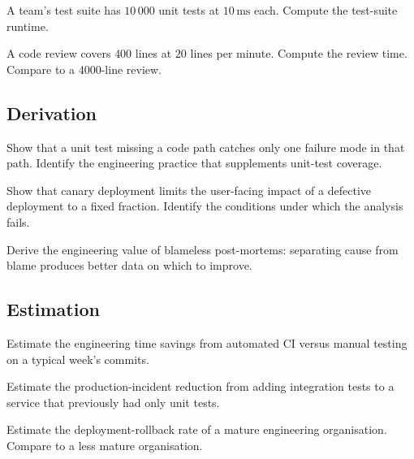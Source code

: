 \begin{exercise}
A team's test suite has $10\,000$ unit tests at $10\,\si{\milli\second}$ each. Compute the test-suite runtime.
\end{exercise}

\begin{exercise}
A code review covers $400$ lines at $20$ lines per minute. Compute the review time. Compare to a $4000$-line review.
\end{exercise}

\subsection*{Derivation}

\begin{exercise}
Show that a unit test missing a code path catches only one failure mode in that path. Identify the engineering practice that supplements unit-test coverage.
\end{exercise}

\begin{exercise}
Show that canary deployment limits the user-facing impact of a defective deployment to a fixed fraction. Identify the conditions under which the analysis fails.
\end{exercise}

\begin{exercise}
Derive the engineering value of blameless post-mortems: separating cause from blame produces better data on which to improve.
\end{exercise}

\subsection*{Estimation}

\begin{exercise}
Estimate the engineering time savings from automated CI versus manual testing on a typical week's commits.
\end{exercise}

\begin{exercise}
Estimate the production-incident reduction from adding integration tests to a service that previously had only unit tests.
\end{exercise}

\begin{exercise}
Estimate the deployment-rollback rate of a mature engineering organisation. Compare to a less mature organisation.
\end{exercise}

